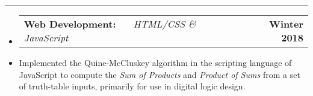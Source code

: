 \documentclass[10pt,letterpaper]{article}
\makeatletter
\newcommand{\header}[2]
{
	\begin{tabular*}{\linewidth}{l @{\extracolsep{\fill}} r}
		\hspace{-27pt} #1 & #2 \\
	\end{tabular*}
}
\makeatother
\begin{document}
\hrule

\begin{itemize}
	\item[]
		\header
		{	
			\textbf{Web Development: }
			\href{https://aashpointo.github.io/KmapWebsite/}{\emph{\underline{\smash{aashpointo.github.io/KmapWebsite}}}} \ \ \ \footnotesize \emph{HTML/CSS \& JavaScript}
		}
		{\textbf{Winter 2018}}
	\item
		Implemented the Quine-McCluskey algorithm in the scripting language of JavaScript to compute the \emph{Sum of Products} and \emph{Product of Sums} from a set of truth-table inputs, primarily for use in digital logic design.

\end{itemize}

																																																																																																																																																																																																																																										
\end{document}
